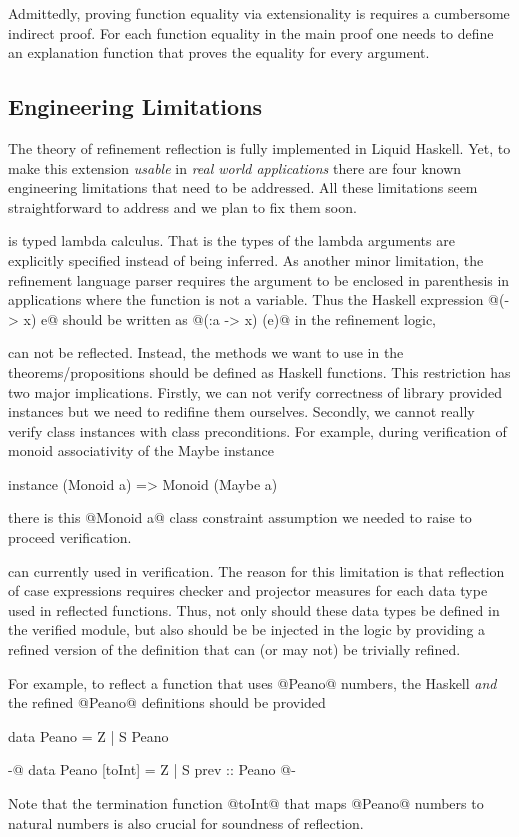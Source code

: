 Admittedly, proving function equality via extensionality
is requires a cumbersome indirect proof. 
%
For each function equality in the main proof
one needs to define an explanation function 
that proves the equality for every argument.


\subsection{Engineering Limitations}
The theory of refinement reflection is fully implemented in Liquid Haskell. 
%
Yet, to make this extension \textit{usable} in \textit{real world applications}
there are four known engineering limitations that need to be addressed. 
% 
All these limitations seem straightforward to address 
and we plan to fix them soon.

is typed lambda calculus. That is the types of the lambda arguments are 
explicitly specified 
instead of being inferred. 
%
As another minor limitation, the refinement language parser 
requires the argument to be enclosed in parenthesis
in applications where the function is not a variable. 
%
Thus the Haskell expression 
@(\x -> x) e@ should be written as @(\x:a -> x) (e)@
in the refinement logic, 

 can not be reflected. 
%
Instead, the methods we want to use in the theorems/propositions
should be defined as Haskell functions. 
%
This restriction has two major implications. 
%
Firstly, we can not verify correctness of library provided 
instances but we need to redifine them ourselves. 
%
Secondly, we cannot really verify class instances with class preconditions. 
%
For example, during verification of monoid associativity of the Maybe instance
\begin{code}
  instance (Monoid a) => Monoid (Maybe a)
\end{code}
%
there is this @Monoid a@ class constraint assumption we needed to raise to 
proceed verification.

can currently used in verification. 
%
The reason for this limitation is that 
reflection of case expressions 
requires checker and projector measures for each 
data type used in reflected functions. 
%
Thus, not only should these data types be defined in 
the verified module, but also should be 
be injected in the logic by providing a refined version of 
the definition that can (or may not) be trivially refined. 

For example, to reflect a function that uses 
@Peano@ numbers, the Haskell \textit{and} the refined @Peano@ 
definitions should be provided
%
\begin{code}
data Peano = Z | S Peano

{-@ data Peano [toInt] 
     = Z 
     | S {prev :: Peano} 
  @-}
\end{code}
%
Note that the termination function @toInt@ 
that maps @Peano@ numbers to natural numbers 
is also crucial for soundness of reflection. 

